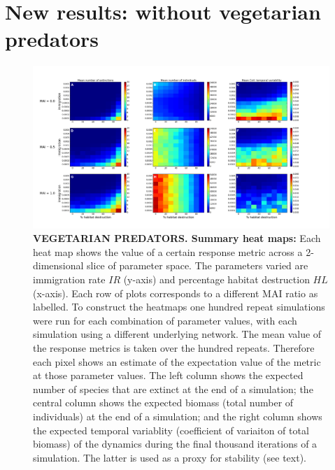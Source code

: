 \newpage

\newpage
\section{New results: without vegetarian predators}

\clearpage
\thispagestyle{empty}
\begin{figure}

		\centering      
		\hspace{-3cm}

        \includegraphics[width=\linewidth]{"./chapters/chapter04/figures/sum_maps"}
        \caption{\textbf{VEGETARIAN PREDATORS. Summary heat maps:} Each heat map shows the value of a certain response metric across a 2-dimensional slice of parameter space. The parameters varied are immigration rate $IR$ (y-axis) and percentage habitat destruction $HL$ (x-axis). Each row of plots corresponds to a different MAI ratio as labelled. To construct the heatmaps one hundred repeat simulations were run for each combination of parameter values, with each simulation using a different underlying network. The mean value of the response metrics is taken over the hundred repeats. Therefore each pixel shows an estimate of the expectation value of the metric at those parameter values. The left column shows the expected number of species that are extinct at the end of a simulation; the central column shows the expected biomass (total number of individuals) at the end of a simulation; and the right column shows the expected temporal variablity (coefficient of variaiton of total biomass) of the dynamics during the final thousand iterations of a simulation. The latter is used as a proxy for stability (see text).}\label{fig:summary_heatmaps_imvshl}
\end{figure}
\clearpage

